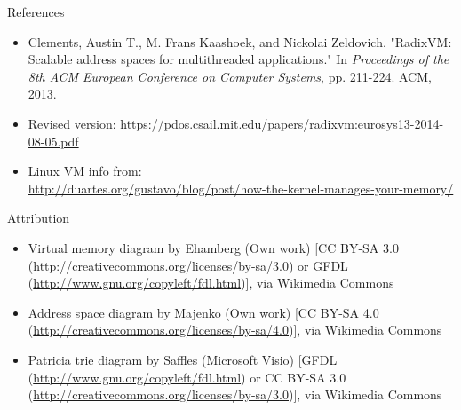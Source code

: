 \documentclass[aspectratio=169]{beamer}
\newcommand{\bi}{\begin{itemize}}
\newcommand{\ei}{\end{itemize}}
\begin{document}
\begin{frame}[noframenumbering]{References}
  \bi
\item Clements, Austin T., M. Frans Kaashoek, and Nickolai Zeldovich. "RadixVM: Scalable address spaces for multithreaded applications." In \emph{Proceedings of the 8th ACM European Conference on Computer Systems}, pp. 211-224. ACM, 2013.
  \item Revised version: \url{https://pdos.csail.mit.edu/papers/radixvm:eurosys13-2014-08-05.pdf}
\item Linux VM info from:\\ \url{http://duartes.org/gustavo/blog/post/how-the-kernel-manages-your-memory/}
  \ei
\end{frame}

\begin{frame}[noframenumbering]{Attribution}
  \bi
\item Virtual memory diagram by Ehamberg (Own work) [CC BY-SA 3.0 (\url{http://creativecommons.org/licenses/by-sa/3.0}) or GFDL (\url{http://www.gnu.org/copyleft/fdl.html})], via Wikimedia Commons
\item Address space diagram by Majenko (Own work) [CC BY-SA 4.0 (\url{http://creativecommons.org/licenses/by-sa/4.0})], via Wikimedia Commons
\item Patricia trie diagram by Saffles (Microsoft Visio) [GFDL (\url{http://www.gnu.org/copyleft/fdl.html}) or CC BY-SA 3.0 (\url{http://creativecommons.org/licenses/by-sa/3.0})], via Wikimedia Commons
  \ei
\end{frame}
\end{document}

